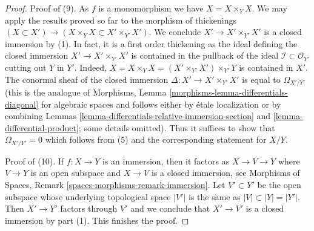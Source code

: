 \documentclass[10pt,a4paper]{amsart}
\theoremstyle{plain}
\theoremstyle{definition}
\theoremstyle{remark}
\numberwithin{equation}{subsection}
\begin{document}
\begin{proof}
\medskip\noindent
Proof of (9). As $f$ is a monomorphism we have $X = X \times_Y X$.
We may apply the results proved so far to the morphism
of thickenings $(X \subset X') \to (X \times_Y X \subset X' \times_{Y'} X')$.
We conclude $X' \to X' \times_{Y'} X'$ is a closed immersion by (1).
In fact, it is a first order thickening as the ideal defining the
closed immersion $X' \to X' \times_{Y'} X'$ is contained in the pullback
of the ideal $\mathcal{I} \subset \mathcal{O}_{Y'}$ cutting out $Y$ in $Y'$.
Indeed, $X = X \times_Y X = (X' \times_{Y'} X') \times_{Y'} Y$ is contained
in $X'$. The conormal sheaf of the closed immersion
$\Delta : X' \to X' \times_{Y'} X'$ is equal to $\Omega_{X'/Y'}$
(this is the analogue of
Morphisms, Lemma \ref{morphisms-lemma-differentials-diagonal}
for algebraic spaces and follows either by \'etale localization
or by combining
Lemmas \ref{lemma-differentials-relative-immersion-section} and
\ref{lemma-differential-product}; some details omitted).
Thus it suffices to show that $\Omega_{X'/Y'} = 0$ which follows from (5)
and the corresponding statement for $X/Y$.

\medskip\noindent
Proof of (10). If $f : X \to Y$ is an immersion, then it factors as
$X \to V \to Y$ where $V \to Y$ is an open subspace and $X \to V$ is a
closed immersion, see
Morphisms of Spaces, Remark \ref{spaces-morphisms-remark-immersion}.
Let $V' \subset Y'$ be the open subspace whose
underlying topological space $|V'|$ is the same as $|V| \subset |Y| = |Y'|$.
Then $X' \to Y'$ factors through $V'$ and we conclude that $X' \to V'$
is a closed immersion by part (1). This finishes the proof.
\end{proof}
\end{document}
